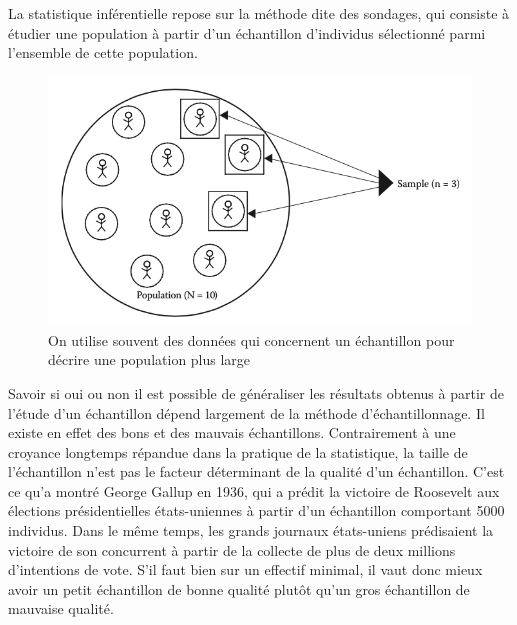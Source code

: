 \documentclass[
]{book}
\begin{document}
La statistique inférentielle repose sur la méthode dite des sondages, qui consiste à étudier une population à partir d'un échantillon d'individus sélectionné parmi l'ensemble de cette population.

\begin{figure}
\centering
\includegraphics{images/sample.png}
\caption{On utilise souvent des données qui concernent un échantillon pour décrire une population plus large}
\end{figure}

Savoir si oui ou non il est possible de généraliser les résultats obtenus à partir de l'étude d'un échantillon dépend largement de la méthode d'échantillonnage. Il existe en effet des bons et des mauvais échantillons. Contrairement à une croyance longtemps répandue dans la pratique de la statistique, la taille de l'échantillon n'est pas le facteur déterminant de la qualité d'un échantillon. C'est ce qu'a montré George Gallup en 1936, qui a prédit la victoire de Roosevelt aux élections présidentielles états-uniennes à partir d'un échantillon comportant 5000 individus. Dans le même temps, les grands journaux états-uniens prédisaient la victoire de son concurrent à partir de la collecte de plus de deux millions d'intentions de vote. S'il faut bien sur un effectif minimal, il vaut donc mieux avoir un petit échantillon de bonne qualité plutôt qu'un gros échantillon de mauvaise qualité.
\end{document}
